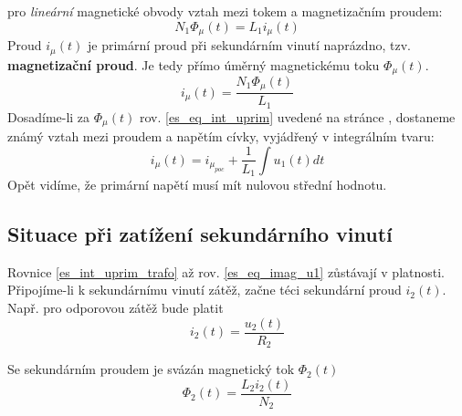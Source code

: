       pro \emph{lineární} magnetické obvody vztah mezi tokem a magnetizačním proudem:
      \begin{equation}\label{es_eq_stat_def_L}
        N_1\Phi_\mu(t)=L_1i_\mu(t)
      \end{equation}
      Proud $i_\mu(t)$ je primární proud při sekundárním vinutí naprázdno, tzv. 
      \textbf{magnetizační proud}. Je tedy přímo úměrný magnetickému toku $\Phi_\mu(t)$.
      \begin{equation}\label{es_eq_imag}
        i_\mu(t)=\frac{N_1\Phi_\mu(t)}{L_1}
      \end{equation}
      Dosadíme-li za $\Phi_\mu(t)$ rov. \ref{es_eq_int_uprim} uvedené na stránce 
      \pageref{es_eq_int_uprim}, dostaneme známý vztah mezi proudem a napětím cívky, vyjádřený v
      integrálním tvaru:
      \begin{equation}\label{es_eq_imag_u1}
        i_\mu(t)=i_{\mu_{poc}}+\frac{1}{L_1}\int{u_1(t)dt}
      \end{equation}
      Opět vidíme, že primární napětí musí mít nulovou střední hodnotu.
      
    \subsection{Situace při zatížení sekundárního vinutí}
      Rovnice \ref{es_int_uprim_trafo} až rov. \ref{es_eq_imag_u1} zůstávají v platnosti. 
      Připojíme-li k sekundárnímu vinutí zátěž, začne téci sekundární proud $i_2(t)$. Např. pro 
      odporovou zátěž bude platit
      \begin{equation}\label{es:eq_i2}
        i_2(t)=\frac{u_2(t)}{R_2}
      \end{equation}

      Se sekundárním proudem je svázán magnetický tok $\Phi_2(t)$
      \begin{equation}\label{es:eq_tok_phi2}
        \Phi_2(t)=\frac{L_2i_2(t)}{N_2}
      \end{equation}

      \begin{figure}[ht!]
        \centering
          {}   \newline
          {}             
        \caption{ }
        \label{ES:fig_004}
      \end{figure}
      
